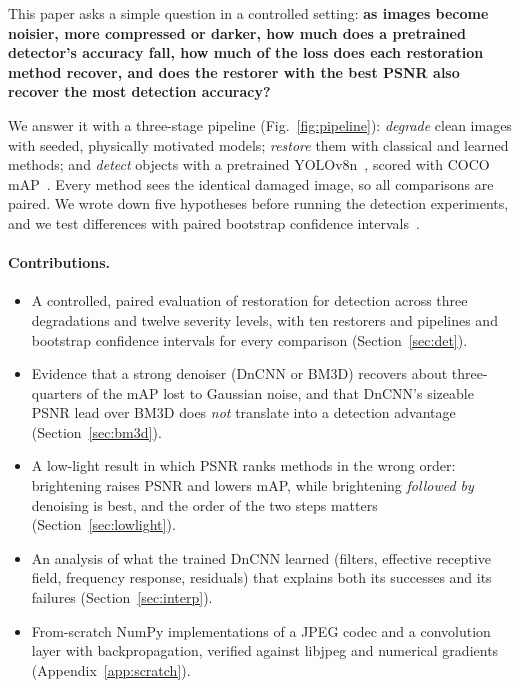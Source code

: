 \documentclass[11pt]{article}
\newcommand{\figref}[1]{Fig.~\ref{#1}}
\newcommand{\secref}[1]{Section~\ref{#1}}
\begin{document}
This paper asks a simple question in a controlled setting: \textbf{as images become noisier, more compressed or darker, how much does a pretrained detector's accuracy fall, how much of the loss does each restoration method recover, and does the restorer with the best PSNR also recover the most detection accuracy?}

We answer it with a three-stage pipeline (\figref{fig:pipeline}): \emph{degrade} clean images with seeded, physically motivated models; \emph{restore} them with classical and learned methods; and \emph{detect} objects with a pretrained YOLOv8n~\citep{jocher2023yolov8}, scored with COCO mAP~\citep{lin2014coco}. Every method sees the identical damaged image, so all comparisons are paired. We wrote down five hypotheses before running the detection experiments, and we test differences with paired bootstrap confidence intervals~\citep{efron1979bootstrap}.

\paragraph{Contributions.}
\begin{itemize}
  \item A controlled, paired evaluation of restoration for detection across three degradations and twelve severity levels, with ten restorers and pipelines and bootstrap confidence intervals for every comparison (\secref{sec:det}).
  \item Evidence that a strong denoiser (DnCNN or BM3D) recovers about three-quarters of the mAP lost to Gaussian noise, and that DnCNN's sizeable PSNR lead over BM3D does \emph{not} translate into a detection advantage (\secref{sec:bm3d}).
  \item A low-light result in which PSNR ranks methods in the wrong order: brightening raises PSNR and lowers mAP, while brightening \emph{followed by} denoising is best, and the order of the two steps matters (\secref{sec:lowlight}).
  \item An analysis of what the trained DnCNN learned (filters, effective receptive field, frequency response, residuals) that explains both its successes and its failures (\secref{sec:interp}).
  \item From-scratch NumPy implementations of a JPEG codec and a convolution layer with backpropagation, verified against libjpeg and numerical gradients (Appendix~\ref{app:scratch}).
\end{itemize}
\end{document}
